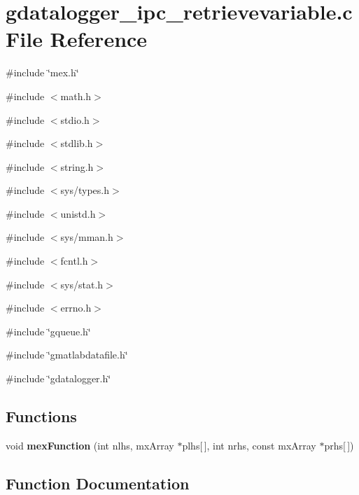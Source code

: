 \section{gdatalogger\_\-ipc\_\-retrievevariable.c File Reference}
\label{libs_2gdatalogger_2demo-pthread_2matlab_2gdatalogger__ipc__retrievevariable_8c}
{\ttfamily \#include \char`\"{}mex.h\char`\"{}}\par
{\ttfamily \#include $<$math.h$>$}\par
{\ttfamily \#include $<$stdio.h$>$}\par
{\ttfamily \#include $<$stdlib.h$>$}\par
{\ttfamily \#include $<$string.h$>$}\par
{\ttfamily \#include $<$sys/types.h$>$}\par
{\ttfamily \#include $<$unistd.h$>$}\par
{\ttfamily \#include $<$sys/mman.h$>$}\par
{\ttfamily \#include $<$fcntl.h$>$}\par
{\ttfamily \#include $<$sys/stat.h$>$}\par
{\ttfamily \#include $<$errno.h$>$}\par
{\ttfamily \#include \char`\"{}gqueue.h\char`\"{}}\par
{\ttfamily \#include \char`\"{}gmatlabdatafile.h\char`\"{}}\par
{\ttfamily \#include \char`\"{}gdatalogger.h\char`\"{}}\par
\subsection*{Functions}
\begin{DoxyCompactItemize}
\item 
void {\bf mexFunction} (int nlhs, mxArray $\ast$plhs[$\,$], int nrhs, const mxArray $\ast$prhs[$\,$])
\end{DoxyCompactItemize}


\subsection{Function Documentation}
